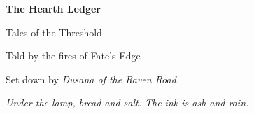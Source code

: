 \documentclass[11pt, twoside]{book}
\begin{document}


\frontmatter

\begin{titlepage}
\centering
\vspace*{2cm}
{\huge\bfseries The Hearth Ledger\par}
\vspace{0.5cm}
{\Large Tales of the Threshold\par}
\vspace{2cm}
{\large Told by the fires of Fate's Edge\par}
\vspace{0.5cm}
{\large Set down by \textit{Dusana of the Raven Road}\par}
\vspace{1.5cm}
{\normalsize \textit{Under the lamp, bread and salt. The ink is ash and rain.}\par}
\vfill
\end{titlepage}

\tableofcontents
\newpage



\mainmatter










































\end{document}
